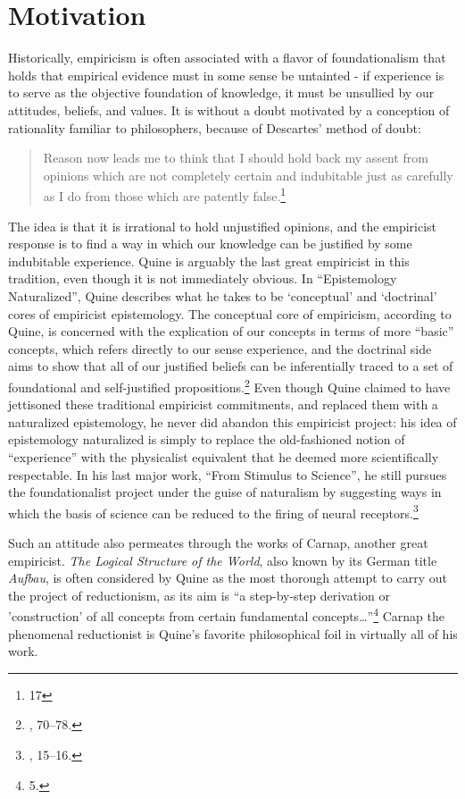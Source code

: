 \hypertarget{motivation}{%
\section{Motivation}\label{motivation}}

Historically, empiricism is often associated with a flavor of
foundationalism that holds that empirical evidence must in some sense be
untainted - if experience is to serve as the objective foundation of
knowledge, it must be unsullied by our attitudes, beliefs, and values.
It is without a doubt motivated by a conception of rationality familiar
to philosophers, because of Descartes' method of doubt:

\begin{quote}
Reason now leads me to think that I should hold back my assent from
opinions which are not completely certain and indubitable just as
carefully as I do from those which are patently false.\footnote{\cite{med} 17}
\end{quote}

The idea is that it is irrational to hold unjustified opinions, and the
empiricist response is to find a way in which our knowledge can be
justified by some indubitable experience. Quine is arguably the last
great empiricist in this tradition, even though it is not immediately
obvious. In ``Epistemology Naturalized'', Quine describes what he takes to
be `conceptual' and `doctrinal' cores of empiricist epistemology. The
conceptual core of empiricism, according to Quine, is concerned with the
explication of our concepts in terms of more ``basic'' concepts, which
refers directly to our sense experience, and the doctrinal side aims to
show that all of our justified beliefs can be inferentially traced to a
set of foundational and self-justified propositions.\footnote{\cite{epistnat}, 70--78.}
Even though Quine claimed to have jettisoned these traditional
empiricist commitments, and replaced them with a naturalized
epistemology, he never did abandon this empiricist project:
his idea of epistemology naturalized is simply to replace the
old-fashioned notion of ``experience'' with the physicalist equivalent that he
deemed more scientifically respectable. In his last major work, ``From
Stimulus to Science'', he still pursues the foundationalist project
under the guise of naturalism by suggesting ways in which the basis
of science can be reduced to the firing of neural receptors.\footnote{\cite{quinefromstim}, 15--16.}

Such an attitude also permeates through the works of Carnap, another
great empiricist. \emph{The Logical Structure of the World}, also known
by its German title \emph{Aufbau}, is often considered by Quine as the
most thorough attempt to carry out the project of reductionism, as its
aim is ``a step-by-step derivation or 'construction' of all concepts
from certain fundamental concepts\ldots{}''\footnote{\cite{aufbau} 5.}
Carnap the phenomenal reductionist is Quine's favorite philosophical
foil in virtually all of his work.

